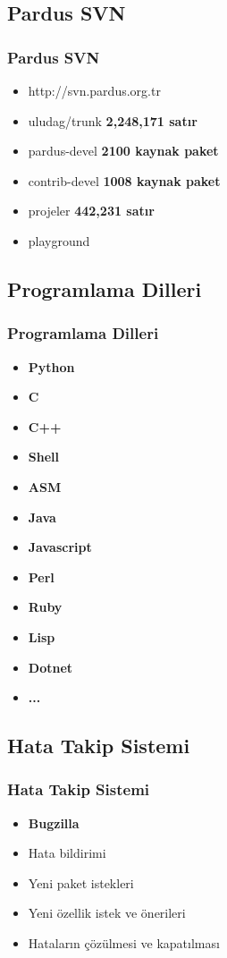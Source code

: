 \documentclass{beamer}
\begin{document}
\subsection{Pardus SVN}
\frame
{
    \frametitle{Pardus SVN}
    \begin{itemize}
        \item http://svn.pardus.org.tr
        \item uludag/trunk \textbf{2,248,171 satır}
        \item pardus-devel \textbf{2100 kaynak paket}
        \item contrib-devel \textbf{1008 kaynak paket}
        \item projeler \textbf{442,231 satır}
        \item playground
    \end{itemize}
}

\subsection{Programlama Dilleri}
\frame
{
    \frametitle{Programlama Dilleri}
    \begin{itemize}
        \item \textbf{Python}
        \item \textbf{C}
        \item \textbf{C++}
        \item \textbf{Shell}
        \item \textbf{ASM}
        \item \textbf{Java}
        \item \textbf{Javascript}
        \item \textbf{Perl}
        \item \textbf{Ruby}
        \item \textbf{Lisp}
        \item \textbf{Dotnet}
        \item \textbf{...}
    \end{itemize}
}

\subsection{Hata Takip Sistemi}
\frame
{
    \frametitle{Hata Takip Sistemi}
    \begin{itemize}
        \item \textbf{Bugzilla}
        \item Hata bildirimi
        \item Yeni paket istekleri
        \item Yeni özellik istek ve önerileri
        \item Hataların çözülmesi ve kapatılması
    \end{itemize}
}
\end{document}
